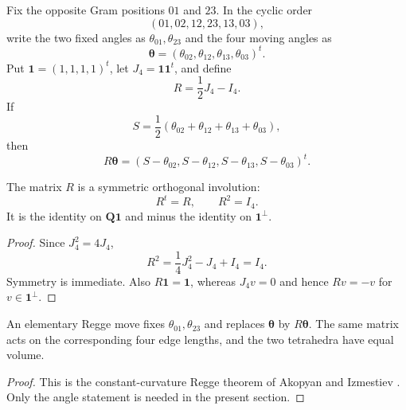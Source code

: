 Fix the opposite Gram positions \(01\) and \(23\).  In the cyclic order
\begin{equation}
 (01,02,12,23,13,03),
 \label{cp:eq-edge-order}
\end{equation}
write the two fixed angles as \(\theta_{01},\theta_{23}\) and the four
moving angles as
\begin{equation}
 \boldsymbol\theta
   =(\theta_{02},\theta_{12},\theta_{13},\theta_{03})^t.
 \label{cp:eq-moving-angle-vector}
\end{equation}
Put \(\mathbf 1=(1,1,1,1)^t\), let
\(J_4=\mathbf1\mathbf1^t\), and define
\begin{equation}
 R=\frac12J_4-I_4.
 \label{cp:eq-regge-matrix}
\end{equation}
If
\begin{equation}
 S=\frac12(\theta_{02}+\theta_{12}+\theta_{13}+\theta_{03}),
 \label{cp:eq-regge-semisum}
\end{equation}
then
\begin{equation}
 R\boldsymbol\theta
 =
 (S-\theta_{02},S-\theta_{12},S-\theta_{13},S-\theta_{03})^t.
 \label{cp:eq-linear-regge-action}
\end{equation}

\begin{lemma}
\label{cp:lem-regge-matrix}
The matrix \(R\) is a symmetric orthogonal involution:
\[
 R^t=R,\qquad R^2=I_4.
\]
It is the identity on \(\mathbf Q\mathbf1\) and minus the identity on
\(\mathbf1^\perp\).
\end{lemma}

\begin{proof}
Since \(J_4^2=4J_4\),
\[
 R^2=\frac14J_4^2-J_4+I_4=I_4.
\]
Symmetry is immediate.  Also \(R\mathbf1=\mathbf1\), whereas
\(J_4v=0\) and hence \(Rv=-v\) for \(v\in\mathbf1^\perp\).
\end{proof}

\begin{theorem}
\label{cp:thm-regge-input}
An elementary Regge move fixes \(\theta_{01},\theta_{23}\) and replaces
\(\boldsymbol\theta\) by \(R\boldsymbol\theta\).  The same matrix acts on
the corresponding four edge lengths, and the two tetrahedra have equal
volume.
\end{theorem}

\begin{proof}
This is the constant-curvature Regge theorem of Akopyan and Izmestiev
\cite[Theorem~1]{AkopyanIzmestiev2019}.  Only the angle statement is needed
in the present section.
\end{proof}

